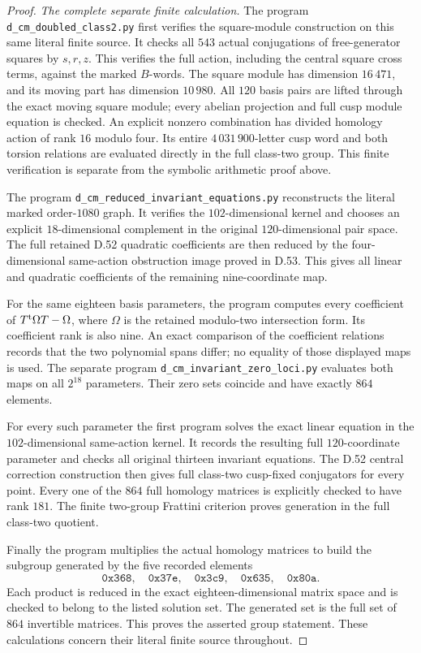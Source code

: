 \begin{proof}
\emph{The complete separate finite calculation.}
The program
\texttt{d\_cm\_doubled\_class2.py}
first verifies the square-module construction
on this same literal finite source.
It checks all \(543\) actual conjugations
of free-generator squares by \(s,r,z\).
This verifies the full action, including
the central square cross terms, against
the marked \(B\)-words.
The square module has dimension
\(16\,471\), and its moving part has
dimension \(10\,980\).
All \(120\) basis pairs are lifted
through the exact moving square module;
every abelian projection and full cusp
module equation is checked.
An explicit nonzero combination has
divided homology action of rank \(16\)
modulo four. Its entire
\(4\,031\,900\)-letter cusp word and
both torsion relations are evaluated
directly in the full class-two group.
This finite verification is separate
from the symbolic arithmetic proof above.

The program
\texttt{d\_cm\_reduced\_invariant\_equations.py}
reconstructs the literal marked
order-\(1080\) graph. It verifies
the \(102\)-dimensional kernel and
chooses an explicit \(18\)-dimensional
complement in the original
\(120\)-dimensional pair space.
The full retained D.52 quadratic
coefficients are then reduced by
the four-dimensional same-action
obstruction image proved in D.53.
This gives all linear and quadratic
coefficients of the remaining
nine-coordinate map.

For the same eighteen basis parameters,
the program computes every coefficient
of \(T^{\rm t}\Omega T-\Omega\), where
\(\Omega\) is the retained modulo-two
intersection form. Its coefficient
rank is also nine.
An exact comparison of the coefficient
relations records that the two
polynomial spans differ; no equality
of those displayed maps is used.
The separate program
\texttt{d\_cm\_invariant\_zero\_loci.py}
evaluates both maps on all \(2^{18}\)
parameters. Their zero sets coincide
and have exactly \(864\) elements.

For every such parameter the first
program solves the exact linear
equation in the \(102\)-dimensional
same-action kernel. It records the
resulting full \(120\)-coordinate
parameter and checks all original
thirteen invariant equations.
The D.52 central correction construction
then gives full class-two cusp-fixed
conjugators for every point.
Every one of the \(864\) full homology
matrices is explicitly checked to
have rank \(181\).
The finite two-group Frattini criterion
proves generation in the full
class-two quotient.

Finally the program multiplies the
actual homology matrices to build
the subgroup generated by the five
recorded elements
\[
 \mathtt{0x368},\quad\mathtt{0x37e},\quad
 \mathtt{0x3c9},\quad\mathtt{0x635},\quad
 \mathtt{0x80a}.
 \tag{D.54.22}
\]
Each product is reduced in the exact
eighteen-dimensional matrix space
and is checked to belong to the
listed solution set. The generated
set is the full set of \(864\)
invertible matrices. This proves
the asserted group statement.
These calculations concern their
literal finite source throughout.


\end{proof}
